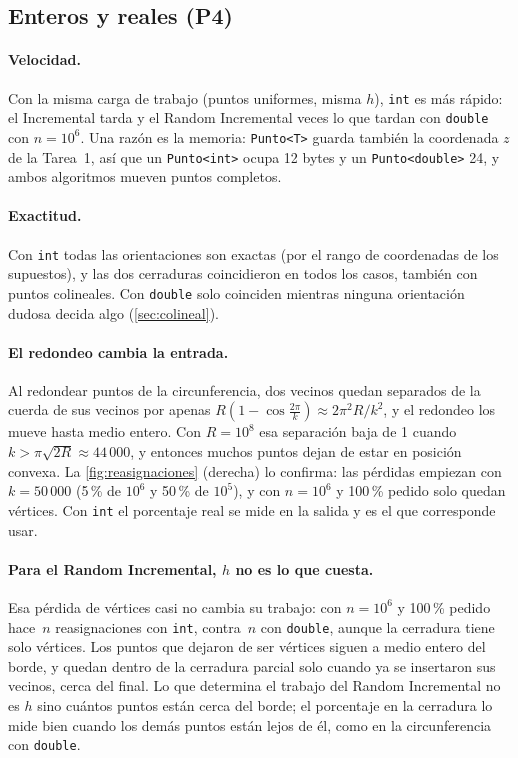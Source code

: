 \documentclass[11pt,letterpaper]{article}
\newcommand{\inc}{\textsf{Incremental}}
\newcommand{\ran}{\textsf{Random Incremental}}
\newcommand{\code}[1]{\texttt{#1}}
\begin{document}
\subsection{Enteros y reales (P4)}
\label{sec:enteros}

\paragraph{Velocidad.} Con la misma carga de trabajo (puntos uniformes, misma
$h$), \code{int} es más rápido: el \inc{} tarda \resIntDoubleUniInc{} y el \ran{}
\resIntDoubleUniRan{} veces lo que tardan con \code{double} con $n=10^6$. Una
razón es la memoria: \code{Punto<T>} guarda también la coordenada $z$ de la
Tarea~1, así que un \code{Punto<int>} ocupa 12 bytes y un \code{Punto<double>}
24, y ambos algoritmos mueven puntos completos.

\paragraph{Exactitud.} Con \code{int} todas las orientaciones son exactas (por
el rango de coordenadas de los supuestos), y las dos cerraduras coincidieron en
todos los casos, también con puntos colineales. Con \code{double} solo
coinciden mientras ninguna orientación dudosa decida algo
(\cref{sec:colineal}).

\paragraph{El redondeo cambia la entrada.} Al redondear puntos de la
circunferencia, dos vecinos quedan separados de la cuerda de sus vecinos por
apenas $R(1-\cos\frac{2\pi}{k})\approx 2\pi^2R/k^2$, y el redondeo los mueve
hasta medio entero. Con $R=10^8$ esa separación baja de 1 cuando
$k>\pi\sqrt{2R}\approx 44\,000$, y entonces muchos puntos dejan de estar en
posición convexa. La \cref{fig:reasignaciones} (derecha) lo confirma: las
pérdidas empiezan con $k=50\,000$ (5\,\% de $10^6$ y 50\,\% de $10^5$), y con
$n=10^6$ y 100\,\% pedido solo quedan \resIntTodosH{} vértices. Con
\code{int} el porcentaje real se mide en la salida y es el que corresponde
usar.

\paragraph{Para el \ran, $h$ no es lo que cuesta.} Esa pérdida de vértices casi
no cambia su trabajo: con $n=10^6$ y 100\,\% pedido hace
\resIntTodosReasigPorN\,$n$ reasignaciones con \code{int}, contra
\resReasigTodosPorN\,$n$ con \code{double}, aunque la cerradura tiene solo
\resIntTodosH{} vértices. Los puntos que dejaron de ser vértices siguen a medio
entero del borde, y quedan dentro de la cerradura parcial solo cuando ya se
insertaron sus vecinos, cerca del final. Lo que determina el trabajo del \ran{}
no es $h$ sino cuántos puntos están cerca del borde; el porcentaje en la
cerradura lo mide bien cuando los demás puntos están lejos de él, como en la
circunferencia con \code{double}.
\end{document}
